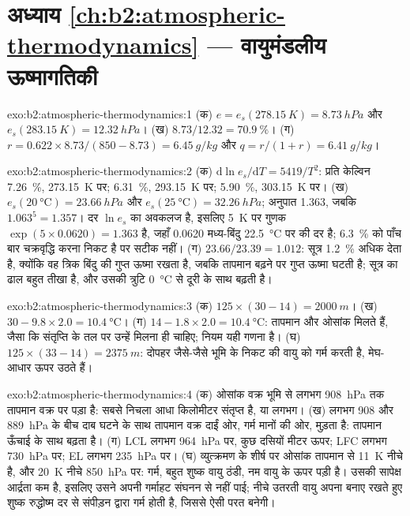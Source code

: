 \section*{अध्याय \ref{ch:b2:atmospheric-thermodynamics} --- वायुमंडलीय ऊष्मागतिकी}

\begin{solution}{exo:b2:atmospheric-thermodynamics:1}
(क) $e = e_s(\qty{278.15}{K}) = \qty{8.73}{hPa}$ और $e_s(\qty{283.15}{K}) = \qty{12.32}{hPa}$।
(ख) $8.73/12.32 = \qty{70.9}{\percent}$। (ग) $r = 0.622 \times 8.73/(850 - 8.73) =
\qty{6.45}{g/kg}$ और $q = r/(1 + r) = \qty{6.41}{g/kg}$।
\end{solution}

\begin{solution}{exo:b2:atmospheric-thermodynamics:2}
(क) $\mathrm{d}\ln e_s/\mathrm{d}T = 5419/T^2$: प्रति केल्विन \qty{7.26}{\percent},
\qty{273.15}{K} पर; \qty{6.31}{\percent}, \qty{293.15}{K} पर; \qty{5.90}{\percent},
\qty{303.15}{K} पर। (ख) $e_s(\qty{20}{\celsius}) = \qty{23.66}{hPa}$ और $e_s(\qty{25}{\celsius})
= \qty{32.26}{hPa}$; अनुपात 1.363, जबकि $1.063^5 = 1.357$। दर
$\ln e_s$ का अवकलज है, इसलिए \qty{5}{K} पर गुणक $\exp(5 \times 0.0620) = 1.363$ है, जहाँ 0.0620
मध्य-बिंदु \qty{22.5}{\celsius} पर की दर है; \qty{6.3}{\percent} को पाँच बार चक्रवृद्धि करना निकट है
पर सटीक नहीं। (ग) $23.66/23.39 = 1.012$: सूत्र \qty{1.2}{\percent} अधिक देता है, क्योंकि
वह त्रिक बिंदु की गुप्त ऊष्मा रखता है, जबकि तापमान बढ़ने पर गुप्त ऊष्मा घटती है; सूत्र का ढाल
बहुत तीखा है, और उसकी त्रुटि
\qty{0}{\celsius} से दूरी के साथ बढ़ती है।
\end{solution}

\begin{solution}{exo:b2:atmospheric-thermodynamics:3}
(क) $125 \times (30 - 14) = \qty{2000}{m}$। (ख) $30 - 9.8 \times 2.0 = \qty{10.4}{\celsius}$।
(ग) $14 - 1.8 \times 2.0 = \qty{10.4}{\celsius}$: तापमान और ओसांक मिलते हैं, जैसा कि संतृप्ति के
तल पर उन्हें मिलना ही चाहिए; नियम यही गणना है। (घ) $125 \times (33 - 14) = \qty{2375}{m}$:
दोपहर जैसे-जैसे भूमि के निकट की वायु को गर्म करती है, मेघ-आधार ऊपर उठते हैं।
\end{solution}

\begin{solution}{exo:b2:atmospheric-thermodynamics:4}
(क) ओसांक वक्र भूमि से लगभग \qty{908}{hPa} तक तापमान वक्र पर पड़ा है:
सबसे निचला आधा किलोमीटर संतृप्त है, या लगभग। (ख) लगभग 908 और \qty{889}{hPa} के बीच
दाब घटने के साथ तापमान वक्र दाईं ओर, गर्म मानों की ओर, मुड़ता है: तापमान
ऊँचाई के साथ बढ़ता है। (ग) LCL लगभग \qty{964}{hPa} पर, कुछ दसियों मीटर ऊपर; LFC लगभग
\qty{730}{hPa} पर; EL लगभग \qty{235}{hPa} पर। (घ) व्युत्क्रमण के शीर्ष पर ओसांक तापमान से
\qty{11}{K} नीचे है, और \qty{20}{K} नीचे \qty{850}{hPa} पर: गर्म, बहुत शुष्क वायु ठंडी, नम वायु के
ऊपर पड़ी है। उसकी सापेक्ष आर्द्रता कम है, इसलिए उसने अपनी गर्माहट संघनन से नहीं पाई; नीचे उतरती
वायु अपना  बनाए रखते हुए शुष्क रुद्धोष्म दर से संपीड़न द्वारा गर्म होती है,
जिससे ऐसी परत बनेगी।
\end{solution}

